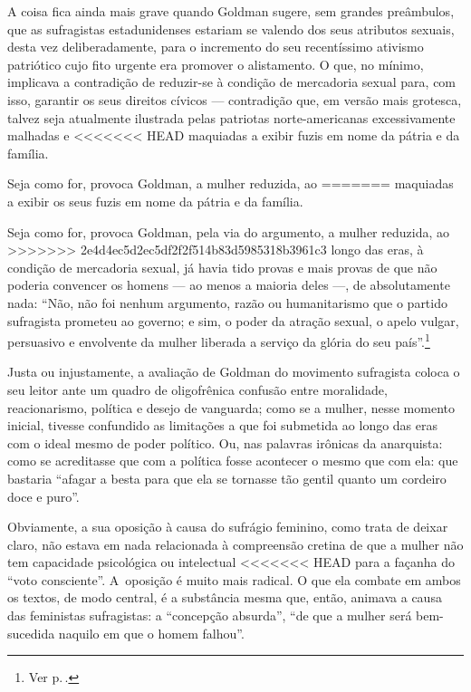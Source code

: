 A coisa fica ainda mais grave quando
Goldman sugere, sem grandes preâmbulos,
que as sufragistas estadunidenses estariam se valendo dos seus atributos sexuais, desta vez
deliberadamente, para o incremento do seu recentíssimo ativismo
patriótico cujo fito urgente era promover o alistamento. O
que, no mínimo, implicava a contradição de reduzir-se à condição de
mercadoria sexual para, com isso, garantir os seus direitos cívicos ---
contradição que, em versão mais grotesca, talvez seja atualmente
ilustrada pelas patriotas norte-americanas excessivamente malhadas e
<<<<<<< HEAD
maquiadas a exibir fuzis em nome da pátria e da família.

Seja
como for, provoca Goldman, a mulher reduzida, ao
=======
maquiadas a exibir os seus fuzis em nome da pátria e da família. 

Seja
como for, provoca Goldman, pela via do argumento, a mulher reduzida, ao
>>>>>>> 2e4d4ec5d2ec5df2f2f514b83d5985318b3961c3
longo das eras, à condição de mercadoria sexual, já havia tido provas e
mais provas de que não poderia convencer os homens --- ao menos a maioria
deles ---, de absolutamente nada: ``Não, não foi nenhum argumento, razão ou humanitarismo que o partido sufragista prometeu ao governo; e sim, o poder da atração
sexual, o apelo vulgar, persuasivo e envolvente da mulher liberada a
serviço da glória do seu país''.\footnote{Ver p.\,\pageref{argumento}.}

Justa ou injustamente, a avaliação de Goldman do movimento sufragista
coloca o seu leitor ante um quadro de oligofrênica confusão entre
moralidade, reacionarismo, política e desejo de vanguarda; como se a
mulher, nesse momento inicial, tivesse confundido as limitações a que
foi submetida ao longo das eras com o ideal mesmo de poder político. Ou,
nas palavras irônicas da anarquista: como se acreditasse que com a
política fosse acontecer o mesmo que com ela: que bastaria ``afagar a
besta para que ela se tornasse tão gentil quanto um cordeiro doce e
puro''.

Obviamente, a sua oposição à causa do sufrágio feminino, como
trata de deixar claro, não estava em nada relacionada à compreensão
cretina de que a mulher não tem capacidade psicológica ou intelectual
<<<<<<< HEAD
para a façanha do ``voto consciente''. A~oposição é muito mais
radical. O que ela combate em ambos os textos, de modo central, é a
substância mesma que, então, animava a causa das feministas sufragistas:
a ``concepção absurda'', ``de que a mulher será bem-sucedida naquilo em
que o homem falhou''.


